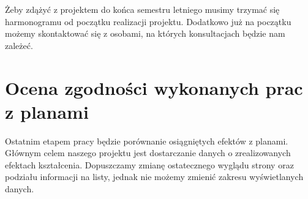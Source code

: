 \documentclass{article}
\begin{document}
Żeby zdążyć z projektem do końca semestru letniego musimy trzymać się harmonogramu od początku realizacji projektu. Dodatkowo już na początku możemy skontaktować się z osobami, 
na których konsultacjach będzie nam zależeć.


\section{Ocena zgodności wykonanych prac z planami}
Ostatnim etapem pracy będzie porównanie osiągniętych efektów z planami. Głównym celem naszego projektu jest dostarczanie danych o zrealizowanych efektach kształcenia.
Dopuszczamy zmianę ostatecznego wyglądu strony oraz podziału informacji na listy, jednak nie możemy zmienić zakresu wyświetlanych danych.
\end{document}
